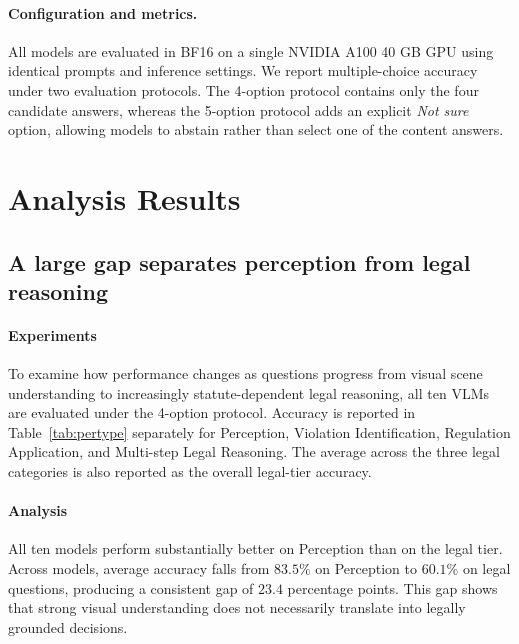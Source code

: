 \paragraph{Configuration and metrics.}
All models are evaluated in BF16 on a single NVIDIA A100 40 GB GPU using identical prompts and inference settings. We report multiple-choice accuracy under two evaluation protocols. The 4-option protocol contains only the four candidate answers, whereas the 5-option protocol adds an explicit \textit{Not sure} option, allowing models to abstain rather than select one of the content answers.

\section{Analysis Results}
\label{sec:results}

\subsection{A large gap separates perception from legal reasoning}
\label{sec:gap}
\paragraph{Experiments} To examine how performance changes as questions progress from visual scene understanding to increasingly statute-dependent legal reasoning, all ten VLMs are evaluated under the 4-option protocol. Accuracy is reported in Table~\ref{tab:pertype} separately for Perception, Violation Identification, Regulation Application, and Multi-step Legal Reasoning. The average across the three legal categories is also reported as the overall legal-tier accuracy.
\paragraph{Analysis}
All ten models perform substantially better on Perception than on the legal tier. Across models, average accuracy falls from $83.5\%$ on Perception to $60.1\%$ on legal questions, producing a consistent gap of $23.4$ percentage points. This gap shows that strong visual understanding does not necessarily translate into legally grounded decisions.


